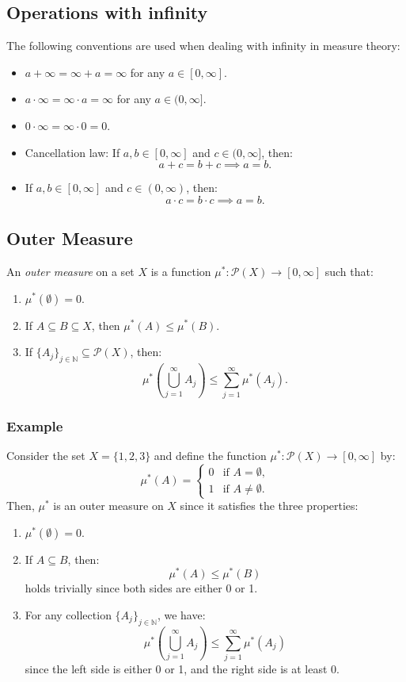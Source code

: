 \documentclass[11pt]{article}
\begin{document}
\subsection{Operations with infinity}
The following conventions are used when dealing with infinity in measure theory:
\begin{itemize}
    \item \(a + \infty = \infty + a = \infty\) for any \(a \in [0, \infty]\).
    \item \(a \cdot \infty = \infty \cdot a = \infty\) for any \(a \in (0, \infty]\).
    \item \(0 \cdot \infty = \infty \cdot 0 = 0\).
    \item Cancellation law: If \(a, b \in [0, \infty]\) and \(c \in (0, \infty]\), then:
    \[a + c = b + c \implies a = b.\]
    \item If \(a, b \in [0, \infty]\) and \(c \in (0, \infty)\), then:
    \[a \cdot c = b \cdot c \implies a = b.\]
\end{itemize}

\subsection{Outer Measure}
An \textit{outer measure} on a set \(X\) is a function \(\mu^*: \mathcal{P}(X) \to [0, \infty]\) such that:
\begin{enumerate}
    \item \(\mu^*(\emptyset) = 0\).
    \item If \(A \subseteq B \subseteq X\), then \(\mu^*(A) \leq \mu^*(B)\).
    \item If \(\{A_j\}_{j \in \mathbb{N}} \subseteq \mathcal{P}(X)\), then:
    \[\mu^*\left(\bigcup_{j=1}^{\infty} A_j\right) \leq \sum_{j=1}^{\infty} \mu^*(A_j).\]
\end{enumerate}

\subsubsection*{Example}
Consider the set \(X = \{1, 2, 3\}\) and define the function \(\mu^*: \mathcal{P}(X) \to [0, \infty]\) by:
\[\mu^*(A) = \begin{cases} 0 & \text{if } A = \emptyset, \\ 1 & \text{if } A \neq \emptyset. \end{cases}\]
Then, \(\mu^*\) is an outer measure on \(X\) since it satisfies the three properties:
\begin{enumerate}
    \item \(\mu^*(\emptyset) = 0\).
    \item If \(A \subseteq B\), then:
    \[\mu^*(A) \leq \mu^*(B)\] holds trivially since both sides are either 0 or 1.
    \item For any collection \(\{A_j\}_{j \in \mathbb{N}}\), we have:
    \[\mu^*\left(\bigcup_{j=1}^{\infty} A_j\right) \leq \sum_{j=1}^{\infty} \mu^*(A_j)\] since the left side is either 0 or 1, and the right side is at least 0.
\end{enumerate}
\end{document}
